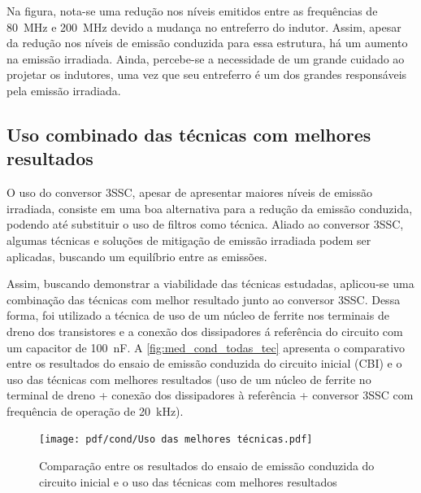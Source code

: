     Na figura, nota-se uma redução nos níveis emitidos entre as frequências de \SI{80}{\mega\hertz} e \SI{200}{\mega\hertz} devido a mudança no entreferro do indutor. Assim, apesar da redução nos níveis de emissão conduzida para essa estrutura, há um aumento na emissão irradiada. Ainda, percebe-se a necessidade de um grande cuidado ao projetar os indutores, uma vez que seu entreferro é um dos grandes responsáveis pela emissão irradiada. 
    
    
    \subsection{Uso combinado das técnicas com melhores resultados} \label{cap:result_tecnicas_total}
    
    O uso do conversor 3SSC, apesar de apresentar maiores níveis de emissão irradiada, consiste em uma boa alternativa para a redução da emissão conduzida, podendo até substituir o uso de filtros como técnica. Aliado ao conversor 3SSC, algumas técnicas e soluções de mitigação de emissão irradiada podem ser aplicadas, buscando um equilíbrio entre as emissões. 
    
    Assim, buscando demonstrar a viabilidade das técnicas estudadas, aplicou-se uma combinação das técnicas com melhor resultado junto ao conversor 3SSC. Dessa forma, foi utilizado a técnica de uso de um núcleo de ferrite nos terminais de dreno dos transistores e a conexão dos dissipadores á referência do circuito com um capacitor de \SI{100}{\nano\farad}. A \autoref{fig:med_cond_todas_tec} apresenta o comparativo entre os resultados do ensaio de emissão conduzida do circuito inicial (CBI) e o uso das técnicas com melhores resultados (uso de um núcleo de ferrite no terminal de dreno + conexão dos dissipadores à referência + conversor 3SSC com frequência de operação de \SI{20}{\kilo\hertz}).
    
    \begin{figure}[H]
    	\centering
    	\caption{Comparação entre os resultados do ensaio de emissão conduzida do circuito inicial e o uso das técnicas com melhores resultados}
    	\texttt{[image: pdf/cond/Uso das melhores técnicas.pdf]}
    	\label{fig:med_cond_todas_tec}
    \end{figure}
    
